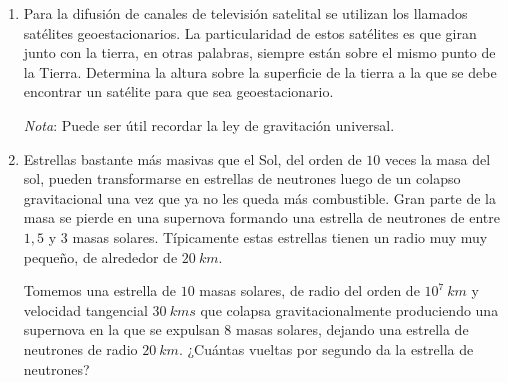 \documentclass[letterpaper]{article}
\begin{document}
\begin{enumerate}

\item Para la difusión de canales de televisión satelital se utilizan los llamados satélites geoestacionarios. La particularidad de estos satélites es que giran junto con la tierra, en otras palabras, siempre están sobre el mismo punto de la Tierra. Determina la altura sobre la superficie de la tierra a la que se debe encontrar un satélite para que sea geoestacionario.

\emph{Nota}: Puede ser útil recordar la ley de gravitación universal.

\item Estrellas bastante más masivas que el Sol, del orden de $10$ veces la masa del sol, pueden transformarse en estrellas de neutrones luego de un colapso gravitacional una vez que ya no les queda más combustible. Gran parte de la masa se pierde en una supernova formando una estrella de neutrones de entre $1,5$ y $3$ masas solares. Típicamente estas estrellas tienen un radio muy muy pequeño, de alrededor de $20\ \si{km}$. 

Tomemos una estrella de $10$ masas solares, de radio del orden de $10^7\ \si{km}$ y velocidad tangencial $30\ \si{km}{s}$ que colapsa gravitacionalmente produciendo una supernova en la que se expulsan $8$ masas solares, dejando una estrella de neutrones de radio $20\ \si{km}$. ¿Cuántas vueltas por segundo da la estrella de neutrones?

\end{enumerate}
\end{document}
